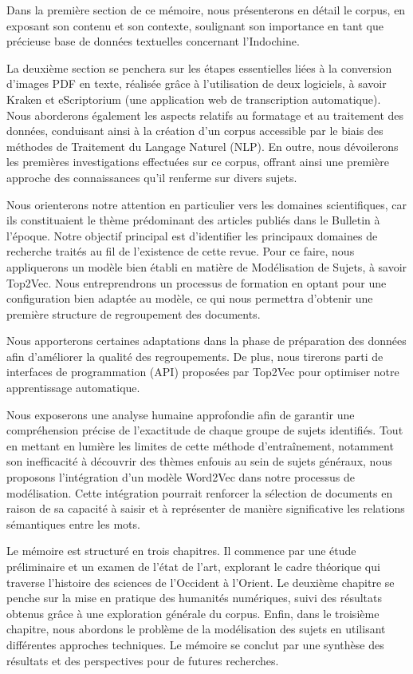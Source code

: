 Dans la première section de ce mémoire, nous présenterons en détail le corpus, en exposant son contenu et son contexte, soulignant son importance en tant que précieuse base de données textuelles concernant l'Indochine.

La deuxième section se penchera sur les étapes essentielles liées à la conversion d'images PDF en texte, réalisée grâce à l'utilisation de deux logiciels, à savoir Kraken et eScriptorium (une application web de transcription automatique). Nous aborderons également les aspects relatifs au formatage et au traitement des données, conduisant ainsi à la création d'un corpus accessible par le biais des méthodes de Traitement du Langage Naturel (NLP). En outre, nous dévoilerons les premières investigations effectuées sur ce corpus, offrant ainsi une première approche des connaissances qu'il renferme sur divers sujets.

Nous orienterons notre attention en particulier vers les domaines scientifiques, car ils constituaient le thème prédominant des articles publiés dans le Bulletin à l'époque. Notre objectif principal est d'identifier les principaux domaines de recherche traités au fil de l'existence de cette revue. Pour ce faire, nous appliquerons un modèle bien établi en matière de Modélisation de Sujets, à savoir Top2Vec. Nous entreprendrons un processus de formation en optant pour une configuration bien adaptée au modèle, ce qui nous permettra d'obtenir une première structure de regroupement des documents.

Nous apporterons certaines adaptations dans la phase de préparation des données afin d'améliorer la qualité des regroupements. De plus, nous tirerons parti de interfaces de programmation (API) proposées par Top2Vec pour optimiser notre apprentissage automatique.

Nous exposerons une analyse humaine approfondie afin de garantir une compréhension précise de l'exactitude de chaque groupe de sujets identifiés. Tout en mettant en lumière les limites de cette méthode d'entraînement, notamment son inefficacité à découvrir des thèmes enfouis au sein de sujets généraux, nous proposons l'intégration d'un modèle Word2Vec dans notre processus de modélisation. Cette intégration pourrait renforcer la sélection de documents en raison de sa capacité à saisir et à représenter de manière significative les relations sémantiques entre les mots.

Le mémoire est structuré en trois chapitres. Il commence par une étude préliminaire et un examen de l'état de l'art, explorant le cadre théorique qui traverse l'histoire des sciences de l'Occident à l'Orient. Le deuxième chapitre se penche sur la mise en pratique des humanités numériques, suivi des résultats obtenus grâce à une exploration générale du corpus. Enfin, dans le troisième chapitre, nous abordons le problème de la modélisation des sujets en utilisant différentes approches techniques. Le mémoire se conclut par une synthèse des résultats et des perspectives pour de futures recherches.